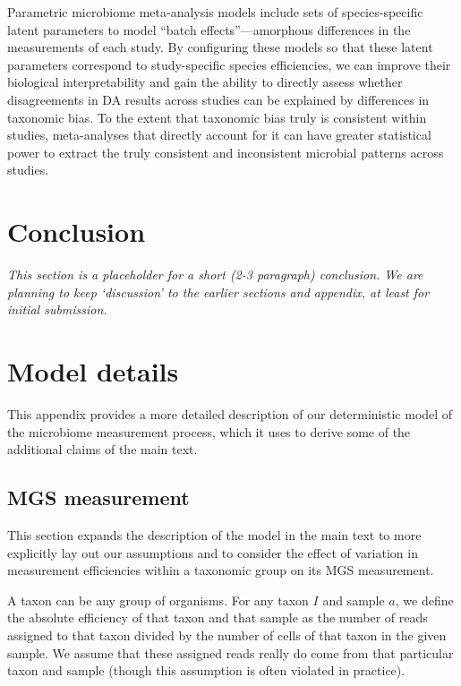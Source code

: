 \documentclass[
]{article}
\begin{document}
Parametric microbiome meta-analysis models include sets of species-specific latent parameters to model ``batch effects''---amorphous differences in the measurements of each study.
By configuring these models so that these latent parameters correspond to study-specific species efficiencies, we can improve their biological interpretability and gain the ability to directly assess whether disagreements in DA results across studies can be explained by differences in taxonomic bias.
To the extent that taxonomic bias truly is consistent within studies, meta-analyses that directly account for it can have greater statistical power to extract the truly consistent and inconsistent microbial patterns across studies.

\hypertarget{conclusion}{%
\section{Conclusion}\label{conclusion}}

\emph{This section is a placeholder for a short (2-3 paragraph) conclusion. We are planning to keep `discussion' to the earlier sections and appendix, at least for initial submission.}

\hypertarget{appendix-appendix}{%
\appendix {}}


\hypertarget{model-details}{%
\section{Model details}\label{model-details}}

This appendix provides a more detailed description of our deterministic model of the microbiome measurement process, which it uses to derive some of the additional claims of the main text.

\hypertarget{mgs-measurement}{%
\subsection{MGS measurement}\label{mgs-measurement}}

This section expands the description of the model in the main text to more explicitly lay out our assumptions and to consider the effect of variation in measurement efficiencies within a taxonomic group on its MGS measurement.

A taxon can be any group of organisms.
For any taxon \(I\) and sample \(a\), we define the absolute efficiency of that taxon and that sample as the number of reads assigned to that taxon divided by the number of cells of that taxon in the given sample.
We assume that these assigned reads really do come from that particular taxon and sample (though this assumption is often violated in practice).
\end{document}
